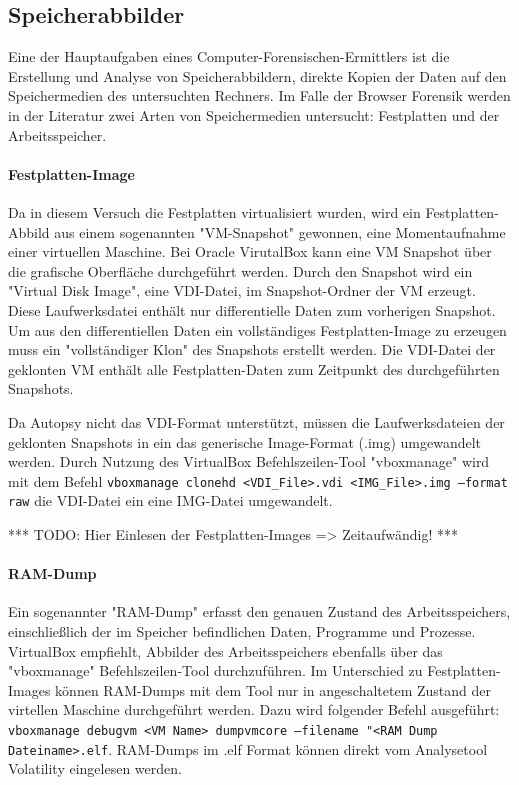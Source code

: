 \subsection*{Speicherabbilder}
Eine der Hauptaufgaben eines Computer-Forensischen-Ermittlers ist die Erstellung und Analyse von Speicherabbildern, direkte Kopien der Daten auf den Speichermedien des untersuchten Rechners. \cite{Hassan.2019}
Im Falle der Browser Forensik werden in der Literatur zwei Arten von Speichermedien untersucht: Festplatten und der Arbeitsspeicher.

\paragraph*{Festplatten-Image}
Da in diesem Versuch die Festplatten virtualisiert wurden, wird ein Festplatten-Abbild aus einem sogenannten "VM-Snapshot" gewonnen, eine Momentaufnahme einer virtuellen Maschine.  %
Bei Oracle VirutalBox kann eine VM Snapshot über die grafische Oberfläche durchgeführt werden.
Durch den Snapshot wird ein "Virtual Disk Image", eine VDI-Datei, im Snapshot-Ordner der VM erzeugt. Diese Laufwerksdatei enthält nur differentielle Daten zum vorherigen Snapshot.
Um aus den differentiellen Daten ein vollständiges Festplatten-Image zu erzeugen muss ein "vollständiger Klon" des Snapshots erstellt werden. Die VDI-Datei der geklonten VM enthält alle Festplatten-Daten zum Zeitpunkt des durchgeführten Snapshots.

Da Autopsy nicht das VDI-Format unterstützt, müssen die Laufwerksdateien der geklonten Snapshots in ein das generische Image-Format (.img) umgewandelt werden.
Durch Nutzung des VirtualBox Befehlszeilen-Tool "vboxmanage" wird mit dem Befehl \texttt{vboxmanage clonehd <VDI\_File>.vdi <IMG\_File>.img --format raw} die VDI-Datei ein eine IMG-Datei umgewandelt.

*** TODO: Hier Einlesen der Festplatten-Images => Zeitaufwändig! ***

\paragraph*{RAM-Dump}

Ein sogenannter "RAM-Dump" erfasst den genauen Zustand des Arbeitsspeichers, einschließlich der im Speicher befindlichen Daten, Programme und Prozesse.
VirtualBox empfiehlt, Abbilder des Arbeitsspeichers ebenfalls über das "vboxmanage" Befehlszeilen-Tool durchzuführen.
Im Unterschied zu Festplatten-Images können RAM-Dumps mit dem Tool nur in angeschaltetem Zustand der virtellen Maschine durchgeführt werden. 
Dazu wird folgender Befehl ausgeführt: \texttt{vboxmanage debugvm <VM Name> dumpvmcore --filename "<RAM Dump Dateiname>.elf}. RAM-Dumps im .elf Format können direkt vom Analysetool Volatility eingelesen werden.		

